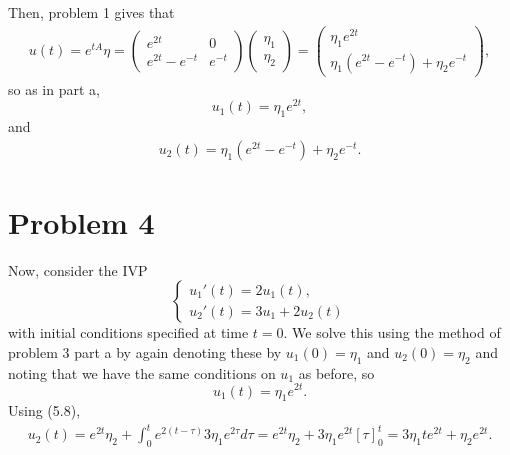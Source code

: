 \documentclass{article}
\begin{document}
Then, problem 1 gives that 
\begin{align*}
u(t)=e^{tA}\eta=\begin{pmatrix}
	e^{2t} &0\\
	e^{2t}-e^{-t} &e^{-t}
\end{pmatrix}\begin{pmatrix}
\eta_1\\ \eta_2
\end{pmatrix}=\begin{pmatrix}
\eta_1e^{2t}\\\eta_1(e^{2t}-e^{-t})+\eta_2e^{-t}
\end{pmatrix},
\end{align*}
so as in part a, 
\[
u_1(t)=\eta_1e^{2t},
\]
and
\begin{align*}
	u_2(t)=\eta_1(e^{2t}-e^{-t})+\eta_2e^{-t}.
\end{align*}

\section{Problem 4}
Now, consider the IVP
\begin{equation*}
	\begin{cases}
		u_1'(t) = 2u_1(t),\\
		u_2'(t) = 3u_1 + 2u_2(t)
	\end{cases}
\end{equation*}
with initial conditions specified at time $t=0$. We solve this using the method of problem 3 part a by again denoting these by $u_1(0)=\eta_1$ and $u_2(0)=\eta_2$ and noting that we have the same conditions on $u_1$ as before, so
\[
u_1(t)=\eta_1e^{2t}.
\]
Using (5.8),
\begin{align*}
	u_2(t)=e^{2t}\eta_2+\int_0^te^{2(t-\tau)}3\eta_1e^{2\tau}d\tau=e^{2t}\eta_2+3\eta_1e^{2t}\left[\tau\right]_0^t=3\eta_1te^{2t}+\eta_2e^{2t}.
\end{align*}
\end{document}
